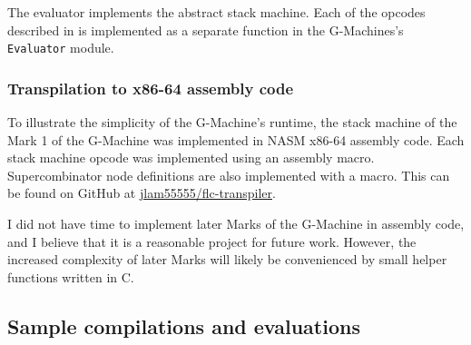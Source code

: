 The evaluator implements the abstract stack machine. Each of the opcodes described in  is implemented as a separate function in the G-Machines's \texttt{Evaluator} module.

\subsubsection{Transpilation to x86-64 assembly code}
\label{sec:gm-transpile-x86}

To illustrate the simplicity of the G-Machine's runtime, the stack machine of the Mark 1 of the G-Machine was implemented in NASM x86-64 assembly code. Each stack machine opcode was implemented using an assembly macro. Supercombinator node definitions are also implemented with a macro. This can be found on GitHub at \href{https://github.com/jlam55555/flc-transpiler}{jlam55555/flc-transpiler}.

I did not have time to implement later Marks of the G-Machine in assembly code, and I believe that it is a reasonable project for future work. However, the increased complexity of later Marks will likely be convenienced by small helper functions written in C.

\subsection{Sample compilations and evaluations}
\label{sec:compiler-examples}



